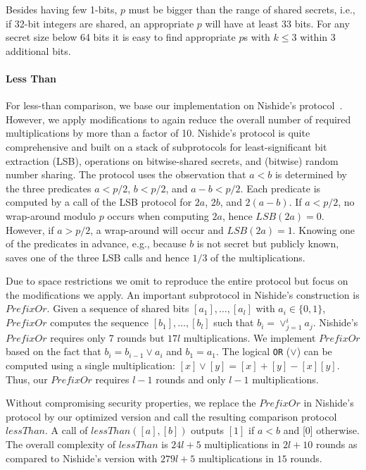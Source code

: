 \documentclass[letterpaper,11pt,onecolumn,titlepage]{article}
\begin{document}
Besides having few 1-bits, $p$ must be bigger than the range of shared secrets, i.e., if 32-bit integers are shared, an appropriate $p$ will have at least 33 bits. For any secret size below 64 bits it is easy to find appropriate $p$s with $k \leq 3$ within 3 additional bits.

\paragraph{Less Than}



For less-than comparison, we base our implementation on Nishide's protocol~\cite{nishide2007nobitdecomp}. However, we apply modifications to again reduce the overall number of required multiplications by more than a factor of 10. Nishide's protocol is quite comprehensive and built on a stack of subprotocols for 
least-significant bit extraction (LSB), operations on bitwise-shared secrets, and (bitwise) random number sharing. The protocol uses the observation that $a<b$ is determined by the three predicates $a<p/2$, $b<p/2$, and $a-b<p/2$. Each predicate is computed by a call of the LSB protocol for $2a$, $2b$, and $2(a-b)$. If $a<p/2$, no wrap-around modulo $p$ occurs when computing $2a$, hence $LSB(2a)=0$. However, if $a>p/2$, a wrap-around will occur and $LSB(2a)=1$.
Knowing one of the predicates in advance, e.g., because $b$ is not secret but publicly known, saves one of the three LSB calls and hence $1/3$ of the multiplications. 

Due to space restrictions we omit to reproduce the entire protocol but focus on the modifications we apply. An important subprotocol in Nishide's construction is $PrefixOr$. Given a sequence of shared bits $[a_1],\ldots,[a_l]$ with $a_i \in \{0,1\}$, $PrefixOr$ computes the sequence $[b_1],\ldots,[b_l]$ such that $b_i = \vee_{j=1}^{i} a_j$. Nishide's $PrefixOr$ requires only 7 rounds but $17l$ multiplications. We implement $PrefixOr$ based on the fact that $b_i = b_{i-1} \vee a_i$ and $b_1=a_1$. The logical \texttt{OR} ($\vee$) can be computed using a single multiplication: $[x] \vee [y] = [x]+[y]-[x][y]$. Thus, our $PrefixOr$ requires $l-1$ rounds and only $l-1$ multiplications. 

Without compromising security properties, we replace the $PrefixOr$ in Nishide's protocol by our optimized version and call the resulting comparison protocol $lessThan$. A call of $lessThan([a],[b])$ outputs $[1]$ if $a<b$ and [0] otherwise. The overall complexity of $lessThan$ is $24l+5$ multiplications in $2l+10$ rounds as compared to Nishide's version with $279l+5$ multiplications in $15$ rounds. 
\end{document}
